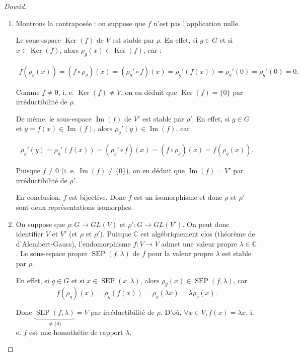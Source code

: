 \documentclass[french]{book}
\theoremstyle{definition}
\begin{document}
\begin{proof}[Dow\'od]

  \

  \begin{enumerate}
    \item Montrons la contraposée : on suppose que \(f\) n'est pas l'application nulle.

    Le sous-espace \(\operatorname{Ker}(f)\) de \(V\) est stable par \(\rho\). En effet, si \(g \in G\) et si \(x \in \operatorname{Ker}(f)\), alors \(\rho_g(x) \in \operatorname{Ker}(f)\), car :

    \begin{gather*}
      f(\rho_g(x)) = (f \circ \rho_g)(x) = (\rho_g' \circ f)(x) = \rho_g'(f(x)) = \rho_g'(0) = \rho_g'(0)=0.
    \end{gather*}

    Comme \(f \neq 0\), i. e. \(\operatorname{Ker}(f) \neq V\), on en déduit que \(\operatorname{Ker}(f) = \{ 0 \}\) par irréductibilité de \(\rho\).

    De même, le sous-espace \(\operatorname{Im}(f)\) de \(V'\) est stable par \(\rho'\). En effet, si \(g \in G\) et \(y=f(x) \in \operatorname{Im}(f)\), alors \(\rho_g'(y) \in \operatorname{Im}(f)\), car

    \begin{gather*}
      \rho_g'(y) = \rho_g'(f(x)) = (\rho_g' \circ f)(x) = (f \circ \rho_g)(x) = f(\rho_g(x)).
    \end{gather*}

    Puisque \(f \neq 0\) (i. e. \(\operatorname{Im}(f) \neq \{ 0 \} \)), on en déduit que \(\operatorname{Im}(f) = V'\) par irréductibilité de \(\rho'\).

    En conclusion, \(f\) est bijective. Donc \(f\) est un isomorphisme et donc \(\rho\) et \(\rho'\) sont deux représentations isomorphes.

    \item On suppose que \(\rho : G \longrightarrow GL(V)\) et \(\rho' : G \longrightarrow GL(V')\). On peut donc identifier \(V\) et \(V'\) (et \(\rho \text{ et } \rho'\)). Puisque \(\mathbb{C}\) est algébriquement clos (théorème de d'Alembert-Gauss), l'endomorphisme \(f : V \longrightarrow V \) admet une valeur propre \(\lambda \in \mathbb{C}\). Le sous-espace propre \(\operatorname{SEP}(f, \lambda)\) de \(f\) pour la valeur propre \(\lambda\) est stable par \(\rho\).

    En effet, si \(g \in G\) et si \(x \in \operatorname{SEP}(x, \lambda)\), alors \(\rho_g(x) \in \operatorname{SEP}(f, \lambda)\), car \[f(\rho_g)(x) = \rho_g(f(x)) = \rho_g(\lambda x) = \lambda \rho_g(x).\]

    Donc \( \underbrace{\operatorname{SEP}(f, \lambda)}_{\neq \{ 0 \}} = V\) par irréductibilité de \(\rho\). D'où, \( \forall x \in V, f(x) = \lambda x\), i. e. \(f\) est une homothétie de rapport \(\lambda\).
  \end{enumerate}
\end{proof}
\end{document}
